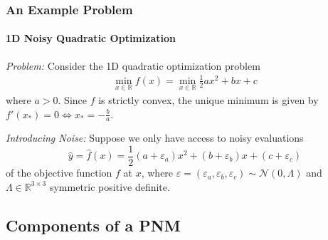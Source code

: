 \documentclass[10pt,usepdftitle=false,aspectratio=169]{beamer}
\begin{document}
\begin{frame}
\begin{columns}
{\begin{tikzpicture}[
				x=0.75pt,
				y=0.75pt,
				yscale=-1,
				xscale=1,
			]
		\end{tikzpicture}
		}

	\end{columns}

	\vspace{1.8em}


\end{frame}

\begin{frame}\frametitle{An Example Problem}
	\framesubtitle{1D Noisy Quadratic Optimization}

	\emph{Problem:}
	Consider the 1D quadratic optimization problem
	\begin{align*}
		\min_{x \in \mathbb{R}} f(x) = \min_{x \in \mathbb{R}} \frac{1}{2} ax^2 + bx + c
	\end{align*}
	where \(a > 0\). Since \(f\) is strictly convex, the unique minimum is given by \(f'(x_*) = 0 \iff
	x_* = -\frac{b}{a}\).
	\vspace{2ex}

	\emph{Introducing Noise:}
	Suppose we only have access to noisy evaluations $$\hat{y} = \hat{f}(x) = \frac{1}{2}(a + \varepsilon_a)x^2 + (b+\varepsilon_b)x
		+ (c + \varepsilon_c)$$	of the objective function
	$f$ at $x$, where $\varepsilon = (\varepsilon_a, \varepsilon_b, \varepsilon_c) \sim \mathcal{N}(0, \Lambda)$ and
	$\Lambda \in \mathbb{R}^{3 \times 3}$ symmetric positive definite.
	\vspace{2ex}


\end{frame}




\subsection{Components of a PNM}
\end{document}

